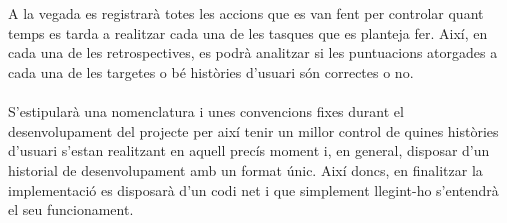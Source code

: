 \\\\
A la vegada es registrarà totes les accions que es van fent per controlar quant temps es tarda a realitzar cada una de les tasques que es planteja fer. Així, en cada una de les retrospectives, es podrà analitzar si les puntuacions atorgades a cada una de les targetes o bé històries d'usuari són correctes o no.
\\\\
S'estipularà una nomenclatura i unes convencions fixes durant el desenvolupament del projecte per així tenir un millor control de quines històries d'usuari s'estan realitzant en aquell precís moment i, en general, disposar d'un historial de desenvolupament amb un format únic. Així doncs, en finalitzar la implementació es disposarà d'un codi net i que simplement llegint-ho s'entendrà el seu funcionament.

